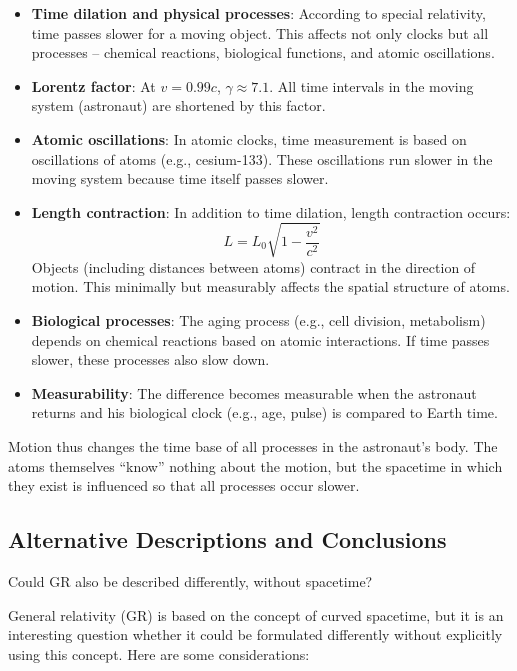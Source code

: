 \documentclass[a4paper,12pt]{article}
\begin{document}
	\begin{itemize}
		\item \textbf{Time dilation and physical processes}: According to special relativity, time passes slower for a moving object. This affects not only clocks but all processes – chemical reactions, biological functions, and atomic oscillations.
		\item \textbf{Lorentz factor}: At \( v = 0.99c \), \( \gamma \approx 7.1 \). All time intervals in the moving system (astronaut) are shortened by this factor.
		\item \textbf{Atomic oscillations}: In atomic clocks, time measurement is based on oscillations of atoms (e.g., cesium-133). These oscillations run slower in the moving system because time itself passes slower.
		\item \textbf{Length contraction}: In addition to time dilation, length contraction occurs:
		\[
		L = L_0 \sqrt{1 - \frac{v^2}{c^2}}
		\]
		Objects (including distances between atoms) contract in the direction of motion. This minimally but measurably affects the spatial structure of atoms.
		\item \textbf{Biological processes}: The aging process (e.g., cell division, metabolism) depends on chemical reactions based on atomic interactions. If time passes slower, these processes also slow down.
		\item \textbf{Measurability}: The difference becomes measurable when the astronaut returns and his biological clock (e.g., age, pulse) is compared to Earth time.
	\end{itemize}
	
	Motion thus changes the time base of all processes in the astronaut's body. The atoms themselves ``know'' nothing about the motion, but the spacetime in which they exist is influenced so that all processes occur slower.
	
	\subsection{Alternative Descriptions and Conclusions}
	Could GR also be described differently, without spacetime?
	
	General relativity (GR) is based on the concept of curved spacetime, but it is an interesting question whether it could be formulated differently without explicitly using this concept. Here are some considerations:
	
\end{document}
